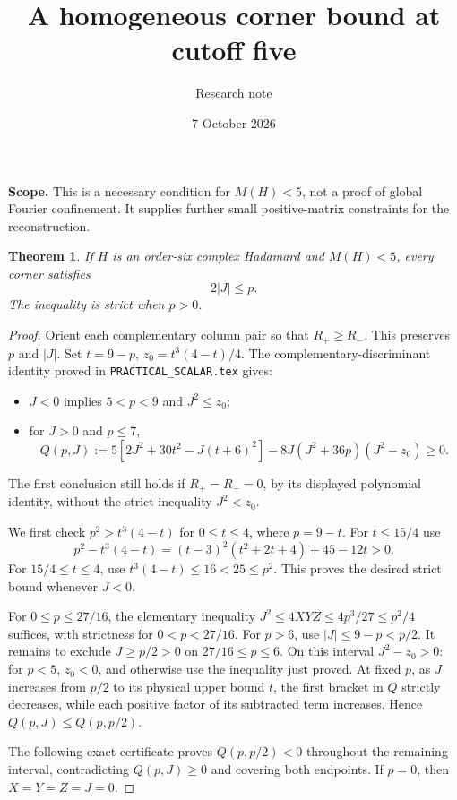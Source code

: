 \documentclass[11pt]{article}
\title{A homogeneous corner bound at cutoff five}
\author{Research note}\date{7 October 2026}
\newtheorem{theorem}{Theorem}
\begin{document}
\maketitle
\noindent\textbf{Scope.} This is a necessary condition for $M(H)<5$,
not a proof of global Fourier confinement. It supplies further small
positive-matrix constraints for the reconstruction.

\begin{theorem}
If $H$ is an order-six complex Hadamard and $M(H)<5$, every corner satisfies
\[
 \boxed{2|J|\le p.}
\]
The inequality is strict when $p>0$.
\end{theorem}
\begin{proof}
Orient each complementary column pair so that $R_+\ge R_-$.
This preserves $p$ and $|J|$. Set $t=9-p$, $z_0=t^3(4-t)/4$.
The complementary-discriminant identity proved in
\texttt{PRACTICAL\_SCALAR.tex} gives:
\begin{itemize}
\item $J<0$ implies $5<p<9$ and $J^2\le z_0$;
\item for $J>0$ and $p\le7$,
\[
 Q(p,J):=5[2J^2+30t^2-J(t+6)^2]
       -8J(J^2+36p)(J^2-z_0)\ge0.
\]
\end{itemize}
The first conclusion still holds if $R_+=R_-=0$, by its displayed
polynomial identity, without the strict inequality $J^2<z_0$.

We first check $p^2>t^3(4-t)$ for $0\le t\le4$, where $p=9-t$.
For $t\le15/4$ use
\[
 p^2-t^3(4-t)=(t-3)^2(t^2+2t+4)+45-12t>0.
\]
For $15/4\le t\le4$, use $t^3(4-t)\le16<25\le p^2$.
This proves the desired strict bound whenever $J<0$.

For $0\le p\le27/16$, the elementary inequality
$J^2\le4XYZ\le4p^3/27\le p^2/4$ suffices, with strictness for
$0<p<27/16$. For $p>6$, use $|J|\le9-p<p/2$.
It remains to exclude $J\ge p/2>0$ on $27/16\le p\le6$.
On this interval $J^2-z_0>0$: for $p<5$, $z_0<0$, and otherwise
use the inequality just proved. At fixed $p$, as $J$ increases from
$p/2$ to its physical upper bound $t$, the first bracket in $Q$
strictly decreases, while each positive factor of its subtracted term
increases. Hence $Q(p,J)\le Q(p,p/2)$.

The following exact certificate proves $Q(p,p/2)<0$ throughout the
remaining interval, contradicting $Q(p,J)\ge0$ and covering both endpoints.
If $p=0$, then $X=Y=Z=J=0$.
\end{proof}
\end{document}
